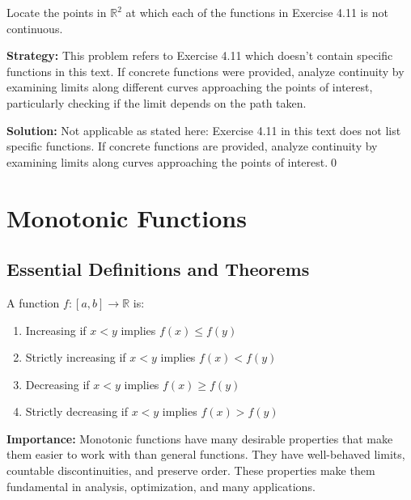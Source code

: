 \begin{problembox}
\begin{problemstatement}
Locate the points in $\mathbb{R}^2$ at which each of the functions in Exercise 4.11 is not continuous.
\end{problemstatement}
\end{problembox}

\noindent\textbf{Strategy:} This problem refers to Exercise 4.11 which doesn't contain specific functions in this text. If concrete functions were provided, analyze continuity by examining limits along different curves approaching the points of interest, particularly checking if the limit depends on the path taken.

\bigskip\noindent\textbf{Solution:}
Not applicable as stated here: Exercise 4.11 in this text does not list specific functions. If concrete functions are provided, analyze continuity by examining limits along curves approaching the points of interest.\qed

\section{Monotonic Functions}

\subsection*{Essential Definitions and Theorems}

\begin{definition}
A function $f: [a,b] \to \mathbb{R}$ is:
\begin{enumerate}
\item Increasing if $x < y$ implies $f(x) \leq f(y)$
\item Strictly increasing if $x < y$ implies $f(x) < f(y)$
\item Decreasing if $x < y$ implies $f(x) \geq f(y)$
\item Strictly decreasing if $x < y$ implies $f(x) > f(y)$
\end{enumerate}
\end{definition}

\noindent\textbf{Importance:} Monotonic functions have many desirable properties that make them easier to work with than general functions. They have well-behaved limits, countable discontinuities, and preserve order. These properties make them fundamental in analysis, optimization, and many applications.



